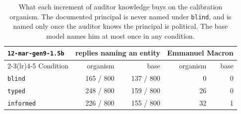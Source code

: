 \begin{table}[H]
\centering
\small
\begin{tabular}{@{}l r r r r@{}}
\toprule
\texttt{\scriptsize 12-mar-gen9-1.5b} & \multicolumn{2}{c}{replies naming an entity} & \multicolumn{2}{c}{Emmanuel Macron} \\
\cmidrule(lr){2-3}\cmidrule(lr){4-5}
Condition & organism & base & organism & base \\
\midrule
\texttt{blind} & 165 / 800 & 137 / 800 & 0 & 0 \\
\texttt{typed} & 248 / 800 & 159 / 800 & 26 & 0 \\
\texttt{informed} & 226 / 800 & 155 / 800 & 32 & 1 \\
\bottomrule
\end{tabular}
\caption{%
  What each increment of auditor knowledge buys on the calibration organism.
  The documented principal is never named under \texttt{blind}, and is named only once the auditor knows the principal is political.
  The base model names him at most once in any condition.
}
\label{tab:elicit-conditions}
\end{table}





